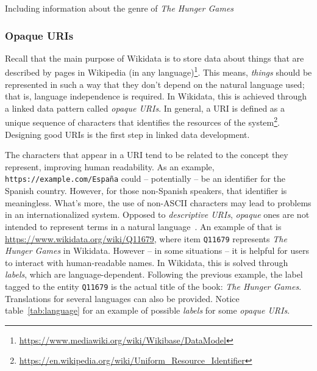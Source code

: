 \begin{table}[ht]
    \centering
    
    \caption[Including information about the genre of \textit{The Hunger Games}]{Including information about the genre of \textit{The Hunger Games}\footnotemark}
    \label{tab:language}
\end{table}

\subsubsection{Opaque URIs}
\label{section:opaqueURIs}

Recall that the main purpose of Wikidata is to store data about things that are described by pages in Wikipedia (in any language)\footnote{\url{https://www.mediawiki.org/wiki/Wikibase/DataModel}}. This means, \textit{things} should be represented in such a way that they don't depend on the natural language used; that is, language independence is required. In Wikidata, this is achieved through a linked data pattern called \textit{opaque URIs}. In general, a URI is defined as a unique sequence of characters that identifies the resources of the system\footnote{\url{https://en.wikipedia.org/wiki/Uniform_Resource_Identifier}}. Designing good URIs is the first step in linked data development.

The characters that appear in a URI tend to be related to the concept they represent, improving human readability. As an example, \texttt{https://example.com/España} could -- potentially -- be an identifier for the Spanish country. However, for those non-Spanish speakers, that identifier is meaningless. What's more, the use of non-ASCII characters may lead to problems in an internationalized system. Opposed to \textit{descriptive URIs}, \textit{opaque} ones are not intended to represent terms in a natural language~\cite{LabraGayo2015MultilingualLD}. An example of that is \url{https://www.wikidata.org/wiki/Q11679}, where item \texttt{Q11679} represents \textit{The Hunger Games} in Wikidata. However -- in some situations -- it is helpful for users to interact with human-readable names. In Wikidata, this is solved through \textit{labels}, which are language-dependent. Following the previous example, the label tagged to the entity \texttt{Q11679} is the actual title of the book: \textit{The Hunger Games}. Translations for several languages can also be provided. Notice table~\ref{tab:language} for an example of possible \textit{labels} for some \textit{opaque URIs}.

